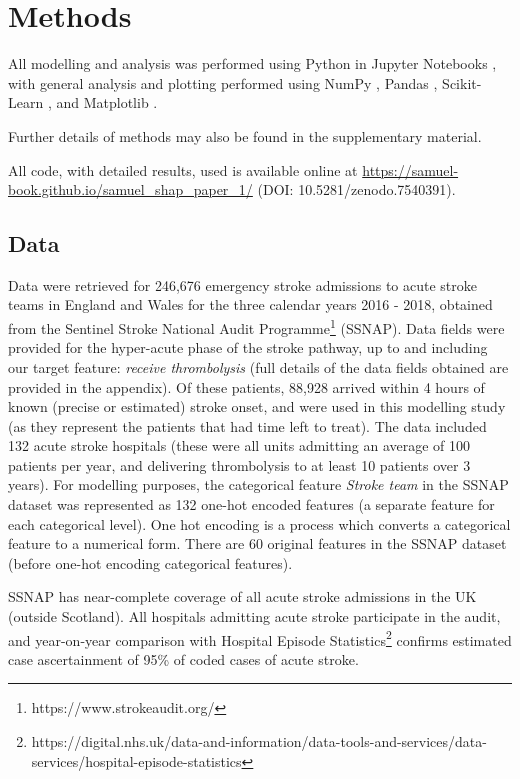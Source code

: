 \renewcommand{\thefootnote}{\alph{footnote}} %

\section{Methods}

All modelling and analysis was performed using Python in Jupyter Notebooks \cite{kluyver_jupyter_2016}, with general analysis and plotting performed using NumPy \cite{harris_array_2020}, Pandas \cite{mckinney-proc-scipy-2010}, Scikit-Learn  \cite{pedregosa_scikit-learn_2011}, and Matplotlib \cite{hunter_matplotlib_2007}. 

Further details of methods may also be found in the supplementary material. 

All code, with detailed results, used is available online at \url{https://samuel-book.github.io/samuel_shap_paper_1/} (DOI: 10.5281/zenodo.7540391). 

\subsection{Data}

Data were retrieved for 246,676 emergency stroke admissions to acute stroke teams in England and Wales for the three calendar years 2016 - 2018, obtained from the Sentinel Stroke National Audit Programme\footnote{https://www.strokeaudit.org/} (SSNAP). Data fields were provided for the hyper-acute phase of the stroke pathway, up to and including our target feature: \emph{receive thrombolysis} (full details of the data fields obtained are provided in the appendix). Of these patients, 88,928 arrived within 4 hours of known (precise or estimated) stroke onset, and were used in this modelling study (as they represent the patients that had time left to treat). The data included 132 acute stroke hospitals (these were all units admitting an average of 100 patients per year, and delivering thrombolysis to at least 10 patients over 3 years). For modelling purposes, the categorical feature \emph{Stroke team} in the SSNAP dataset was represented as 132 one-hot encoded features (a separate feature for each categorical level). One hot encoding is a process which converts a categorical feature to a numerical form. There are 60 original features in the SSNAP dataset (before one-hot encoding categorical features).

 SSNAP has near-complete coverage of all acute stroke admissions in the UK (outside Scotland). All hospitals admitting acute stroke participate in the audit, and year-on-year comparison with Hospital Episode Statistics\footnote{https://digital.nhs.uk/data-and-information/data-tools-and-services/data-services/hospital-episode-statistics} confirms estimated case ascertainment of 95\% of coded cases of acute stroke.


